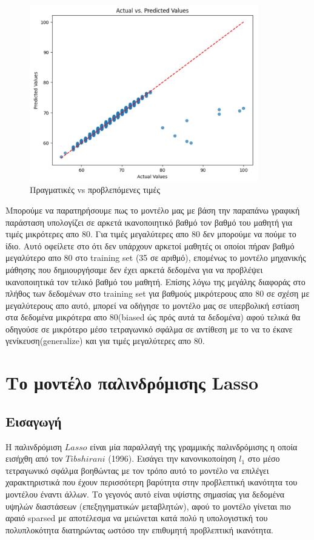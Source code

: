 \documentclass[12pt]{article}
\begin{document}
\begin{figure}
    \centering 
    \includegraphics[width=0.89\textwidth]{./images/icon10.jpg}
    \caption{Πραγματικές vs προβλεπόμενες τιμές}
    \label{fig:Fitting line} 
    
\end{figure}

Μπορούμε να παρατηρήσουμε πως το μοντέλο μας με βάση την παραπάνω γραφική παράσταση υπολογίζει σε αρκετά ικανοποιητικό βαθμό τον βαθμό του μαθητή για τιμές μικρότερες απο 80. Για τιμές μεγαλύτερες απο 80 δεν μπορούμε να πούμε το ίδιο. Αυτό οφείλετε στο ότι δεν υπάρχουν αρκετοί μαθητές οι οποίοι πήραν βαθμό μεγαλύτερο απο 80 στο training set (35 σε αριθμό), επομένως το μοντέλο μηχανικής μάθησης που δημιουργήσαμε δεν έχει αρκετά δεδομένα για να προβλέψει ικανοποιητικά τον τελικό βαθμό του μαθητή. Επίσης λόγω της μεγάλης διαφοράς στο πλήθος των δεδομένων στο training set για βαθμούς μικρότερους απο 80 σε σχέση με μεγαλύτερους απο αυτό, μπορεί να οδήγησε το μοντέλο μας σε υπερβολική εστίαση στα δεδομένα μικρότερα απο 80(biased ώς πρός αυτά τα δεδομένα) αφού τελικά θα οδηγούσε σε μικρότερο μέσο τετραγωνικό σφάλμα σε αντίθεση με το να το έκανε γενίκευση(generalize) και για τιμές μεγαλύτερες απο 80.

\newpage
\section{Το μοντέλο παλινδρόμισης Lasso}
\subsection{Εισαγωγή}

Η παλινδρόμιση $Lasso$ είναι μία παραλλαγή της γραμμικής παλινδρόμισης η οποία εισήχθη από τον $Tibshirani$ (1996). Εισάγει την κανονικοποίηση $l_1$ στο μέσο τετραγωνικό σφάλμα βοηθώντας με τον τρόπο αυτό το μοντέλο να επιλέγει χαρακτηριστικά που έχουν περισσότερη βαρύτητα στην προβλεπτική ικανότητα του μοντέλου έναντι άλλων. Το γεγονός αυτό είναι υψίστης σημασίας για δεδομένα υψηλών διαστάσεων (επεξηγηματικών μεταβλητών), αφού το μοντέλο γίνεται πιο αραιό \textlatin{sparsed} με αποτέλεσμα να μειώνεται κατά πολύ η υπολογιστική του πολυπλοκότητα διατηρώντας ωστόσο την επιθυμητή προβλεπτική ικανότητα.
\end{document}
